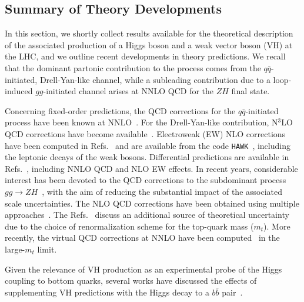 \subsection{Summary of Theory Developments} 
In this section, we shortly collect results available for the theoretical description of the associated production of a Higgs boson and a weak vector boson (VH) at the LHC, and we outline recent developments in theory predictions. We recall that the dominant partonic contribution to the process comes from the $q\bar{q}$-initiated, Drell-Yan-like channel, while a subleading contribution due to a loop-induced $gg$-initiated channel arises at NNLO QCD for the $ZH$ final state.

Concerning fixed-order predictions, the QCD corrections for the $q \bar{q}$-initiated process have been known at NNLO~\cite{Glashow:1978ab, Eichten:1984eu, HAN1991167, Brein:2003wg}. For the Drell-Yan-like contribution, N$^3$LO QCD corrections have become available~\cite{Baglio:2022wzu}. Electroweak (EW) NLO corrections have been computed in Refs.~\cite{Ciccolini:2003jy, Denner:2011id} and are available from the code \texttt{HAWK}~\cite{Denner:2011id,Denner:2014cla}, including the leptonic decays of the weak bosons. Differential predictions are available in Refs.~\cite{Ferrera:2011bk, Ferrera:2013yga,Ferrera:2014lca,Campbell:2016jau,Gauld:2021ule}, including NNLO QCD and NLO EW effects.
In recent years, considerable interest has been devoted to the QCD corrections to the subdominant process $gg \to ZH$~\cite{Dicus:1988yh,Kniehl:1990iva}, with the aim of reducing the substantial impact of the associated scale uncertainties. The NLO QCD corrections have been obtained using multiple approaches~\cite{Altenkamp:2012sx,Hasselhuhn:2016rqt,Davies:2020drs,Chen:2020gae,Wang:2021rxu,Alasfar:2021ppe,Chen:2022rua,Degrassi:2022mro,Davies:2025out, Davies:2026uxl}. The Refs.~\cite{Chen:2022rua,Degrassi:2022mro, Davies:2026uxl} discuss an additional source of theoretical uncertainty due to the choice of renormalization scheme for the top-quark mass ($m_t$). More recently, the virtual QCD corrections at NNLO have been computed~\cite{Davies:2025otz} in the large-$m_t$ limit. 

Given the relevance of VH production as an experimental probe of the Higgs coupling to bottom quarks, several works have discussed the effects of supplementing VH predictions with the Higgs decay to a $b \bar{b}$ pair~\cite{Caola:2017xuq,Gauld:2019yng,Behring:2020uzq}.

